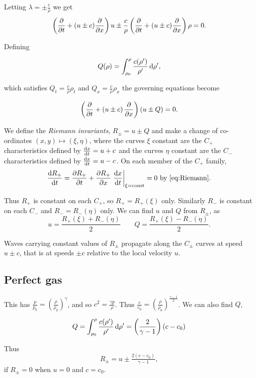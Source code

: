 \documentclass{notes}
\begin{document}
Letting $\lambda = \pm \frac{c}{\rho}$ we get
\[
\left(\frac{\partial }{\partial t} + ( u \pm c) \frac{\partial }{\partial x}
\right) u \pm \frac{c}{\rho} \left( \frac{\partial }{\partial t} + ( u \pm c) \frac{\partial }{\partial x}
\right) \rho = 0.
\]

Defining

\begin{equation}\label{eq:Q}
Q(\rho) = \int_{\rho_0}^\rho \frac{c(\rho')}{\rho'}\, \mathrm{d} \rho',
\end{equation}

which satisfies $Q_t = \frac{c}{\rho}\rho_t$ and $Q_x = \frac{c}{\rho}
\rho_x$ the governing equations become

\begin{equation}\label{eq:Riemann}
\left(\frac{\partial }{\partial t} + \left( u \pm c \right) \frac{\partial }{\partial x} \right)
\left( u \pm Q \right) = 0.
\end{equation}

We define the \emph{Riemann invariants}, $R_\pm = u \pm Q$ and make a
change of co-ordinates $(x,y) \mapsto (\xi,\eta)$, where the curves
$\xi$ constant are the $C_+$ characteristics defined by $\frac{\mathrm{d} x}{\mathrm{d} t} =
u + c$ and the curves $\eta$ constant are the $C_-$ characteristics
defined by $\frac{\mathrm{d} x}{\mathrm{d} t} = u - c$.  On each member of the $C_+$ family,
\[
\frac{\mathrm{d} R_+}{\mathrm{d} t} = \frac{\partial R_+}{\partial t} + \frac{\partial R_+}{\partial x} \left.\frac{\mathrm{d} x}{\mathrm{d} t}
\right|_{\xi = \text{const}} = 0 \text{ by \eqref{eq:Riemann}.}
\]

Thus $R_+$ is constant on each $C_+$, so $R_+ = R_+(\xi)$ only.
Similarly $R_-$ is constant on each $C_-$ and $R_- = R_-(\eta)$ only.
We can find $u$ and $Q$ from $R_\pm$, as
\[
u = \frac{R_+(\xi) + R_-(\eta)}{2} \qquad
Q = \frac{R_+(\xi) - R_-(\eta)}{2}.
\]

Waves carrying constant values of $R_\pm$ propagate along the $C_\pm$
curves at speed $u \pm c$, that is at speeds $\pm c$ relative to the
local velocity $u$.

\subsection{Perfect gas}

This has $\tfrac{p}{p_0} = \left( \tfrac{\rho}{\rho_0}
\right)^\gamma$, and so $c^2 = \tfrac{\gamma p}{\rho}$.  Thus
$\tfrac{c}{c_0} = \left( \tfrac{\rho}{\rho_0}
\right)^{\tfrac{\gamma-1}{2}}$.  We can also find $Q$,

\[
Q = \int_{\rho_0}^\rho \frac{c(\rho')}{\rho'}\, \mathrm{d} \rho'
= \left( \frac{2}{\gamma - 1} \right) \left( c - c_0 \right)
\]

Thus
\begin{equation}\label{eq:charC}
R_\pm = u \pm \tfrac{2 (c-c_0)}{\gamma - 1},
\end{equation}
if $R_\pm = 0$ when $u = 0$ and $c = c_0$.
\end{document}
